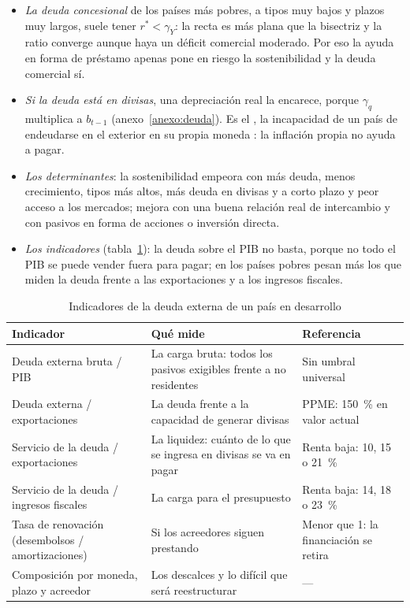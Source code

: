 \documentclass[11pt]{article}
\begin{document}
\begin{itemize}
\item \emph{La deuda concesional} de los países más pobres, a tipos muy bajos y plazos muy largos, suele tener $r^*<\gamma_Y$: la recta es más plana que la bisectriz y la ratio converge aunque haya un déficit comercial moderado. Por eso la ayuda en forma de préstamo apenas pone en riesgo la sostenibilidad y la deuda comercial sí.
\item \emph{Si la deuda está en divisas}, una depreciación real la encarece, porque $\gamma_q$ multiplica a $b_{t-1}$ (anexo~\ref{anexo:deuda}). Es el , la incapacidad de un país de endeudarse en el exterior en su propia moneda\nocite{EichengreenHausmann1999} : la inflación propia no ayuda a pagar.
\item \emph{Los determinantes}: la sostenibilidad empeora con más deuda, menos crecimiento, tipos más altos, más deuda en divisas y a corto plazo y peor acceso a los mercados; mejora con una buena relación real de intercambio y con pasivos en forma de acciones o inversión directa.
\item \emph{Los indicadores} (tabla~\ref{tab:indicadores-deuda}): la deuda sobre el PIB no basta, porque no todo el PIB se puede vender fuera para pagar; en los países pobres pesan más los que miden la deuda frente a las exportaciones y a los ingresos fiscales.
\end{itemize}

\begin{table}[H]
\centering
\caption{Indicadores de la deuda externa de un país en desarrollo}\label{tab:indicadores-deuda}
\small
\begin{tabular}{>{\raggedright\arraybackslash}m{4.3cm}>{\raggedright\arraybackslash}m{5.0cm}>{\raggedright\arraybackslash}m{4.6cm}}
\toprule
\rowcolor{tceeazulpalido} Indicador & Qué mide & Referencia \\
\midrule
Deuda externa bruta / PIB & La carga bruta: todos los pasivos exigibles frente a no residentes & Sin umbral universal \\
Deuda externa / exportaciones & La deuda frente a la capacidad de generar divisas & PPME: 150~\% en valor actual \\
Servicio de la deuda / exportaciones & La liquidez: cuánto de lo que se ingresa en divisas se va en pagar & Renta baja: 10, 15 o 21~\% \\
Servicio de la deuda / ingresos fiscales & La carga para el presupuesto & Renta baja: 14, 18 o 23~\% \\
Tasa de renovación (desembolsos / amortizaciones) & Si los acreedores siguen prestando & Menor que 1: la financiación se retira \\
Composición por moneda, plazo y acreedor & Los descalces y lo difícil que será reestructurar & — \\
\bottomrule
\end{tabular}
\end{table}
\end{document}
